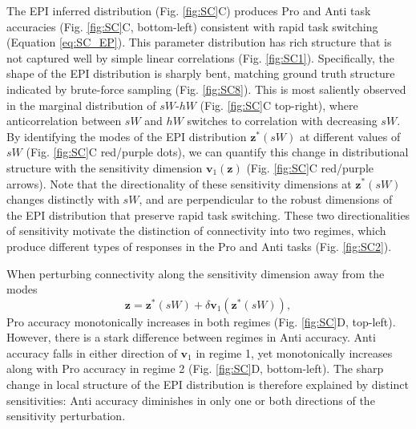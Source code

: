 \documentclass[11pt]{article}
\begin{document}
The EPI inferred distribution  (Fig. \ref{fig:SC}C) produces Pro and Anti task accuracies (Fig. \ref{fig:SC}C, bottom-left) consistent with rapid task switching (Equation \ref{eq:SC_EP}).
This parameter distribution has rich structure that is not captured well by simple linear correlations (Fig. \ref{fig:SC1}).
Specifically, the shape of the EPI distribution is sharply bent, matching ground truth structure indicated by brute-force sampling (Fig. \ref{fig:SC8}).
This is most saliently observed in the marginal distribution of  $sW$-$hW$ (Fig. \ref{fig:SC}C top-right), where anticorrelation between $sW$ and $hW$ switches to correlation with decreasing $sW$.
By identifying the modes of the EPI distribution $\mathbf{z}^*(sW)$ at different values of $sW$ (Fig. \ref{fig:SC}C red/purple dots), we can quantify this change in distributional structure with the sensitivity dimension $\mathbf{v}_1(\mathbf{z})$ (Fig. \ref{fig:SC}C red/purple arrows).
Note that the directionality of these sensitivity dimensions at $\mathbf{z}^*(sW)$ changes distinctly with $sW$, and are perpendicular to the robust dimensions of the EPI distribution that preserve rapid task switching.
These two directionalities of sensitivity motivate the distinction of connectivity into two regimes, which produce different types of responses in the Pro and Anti tasks (Fig. \ref{fig:SC2}).


When perturbing connectivity along the sensitivity dimension away from the modes
\begin{equation}
\mathbf{z} = \mathbf{z}^*(sW) + \delta \mathbf{v}_1(\mathbf{z}^*(sW)),
\end{equation}
Pro accuracy monotonically increases in both regimes (Fig. \ref{fig:SC}D, top-left).
However, there is a stark difference between regimes in Anti accuracy. 
Anti accuracy falls in either direction of $\mathbf{v}_1$ in regime 1, yet monotonically increases along with Pro accuracy in regime 2 (Fig. \ref{fig:SC}D, bottom-left).
The sharp change in local structure of the EPI distribution is therefore explained by distinct sensitivities: Anti accuracy diminishes in only one or both directions of the sensitivity perturbation.
\end{document}
